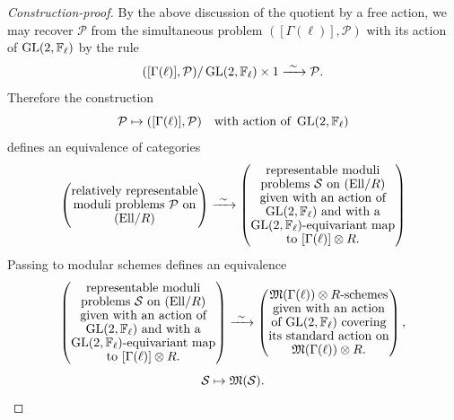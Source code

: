 \begin{proof}[Construction-proof]
By the above discussion of the quotient by a free action, we may recover $\mathcal{P}$ from the simultaneous problem $([\Gamma(\ell)], \mathcal{P})$ with its action of $\operatorname{GL}(2,\mathbb{F}_\ell)$ by the rule
\[
([\Gamma(\ell)], \mathcal{P})/\operatorname{GL}(2,\mathbb{F}_\ell) \times 1 \xrightarrow{\ \sim\ } \mathcal{P} .
\]
Therefore the construction
\[
\mathcal{P} \mapsto ([\Gamma(\ell)], \mathcal{P}) \quad \text{with action of } \operatorname{GL}(2,\mathbb{F}_\ell)
\]
defines an equivalence of categories
\[
\left(\begin{array}{@{}c@{}}
\text{relatively representable} \\[-1pt]
\text{moduli problems $\mathcal{P}$ on} \\[-1pt]
\text{\EllR}
\end{array}\right) \xrightarrow{\ \sim\ }
\left(\begin{array}{@{}c@{}}
\text{representable moduli} \\[-1pt]
\text{problems $\mathcal{S}$ on \EllR} \\[-1pt]
\text{given with an action of} \\[-1pt]
\text{$\GL(2,\F_\ell)$ and with a} \\[-1pt]
\text{$\GL(2,\F_\ell)$-equivariant map} \\[-1pt]
\text{to $[\Gamma(\ell)] \otimes R$.}
\end{array}\right)
\]
Passing to modular schemes defines an equivalence
\[
\left(\begin{array}{@{}c@{}}
\text{representable moduli} \\[-1pt]
\text{problems $\mathcal{S}$ on \EllR} \\[-1pt]
\text{given with an action of} \\[-1pt]
\text{$\GL(2,\F_\ell)$ and with a} \\[-1pt]
\text{$\GL(2,\F_\ell)$-equivariant map} \\[-1pt]
\text{to $[\Gamma(\ell)] \otimes R$.}
\end{array}\right) \xrightarrow{\ \sim\ }
\left(\begin{array}{@{}c@{}}
\text{$\Mfrak(\Gamma(\ell)) \otimes R$-schemes} \\[-1pt]
\text{given with an action} \\[-1pt]
\text{of $\GL(2,\F_\ell)$ covering} \\[-1pt]
\text{its standard action on} \\[-1pt]
\text{$\Mfrak(\Gamma(\ell)) \otimes R$.}
\end{array}\right) ,
\]
\[
\mathcal{S} \mapsto \mathfrak{M}(\mathcal{S}) .
\]

\end{proof}
